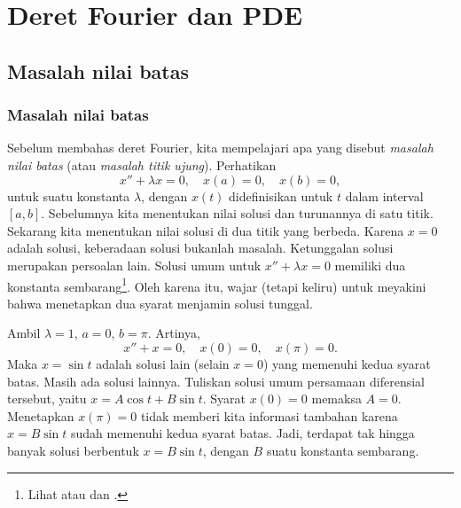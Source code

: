 \chapter{Deret Fourier dan PDE} \label{FS:chapter}


\section{Masalah nilai batas} \label{bvp:section}



\subsection{Masalah nilai batas}

Sebelum membahas deret Fourier, kita mempelajari
apa yang disebut
\emph{masalah nilai batas}
(atau \emph{masalah titik ujung}).  Perhatikan
\begin{equation*}
x'' + \lambda x = 0, \quad x(a) = 0, \quad x(b) = 0,
\end{equation*}
untuk suatu konstanta $\lambda$, dengan $x(t)$ didefinisikan untuk $t$ dalam interval
$[a,b]$.
Sebelumnya kita menentukan nilai solusi dan turunannya
di satu titik.  Sekarang kita menentukan nilai solusi di dua titik
yang berbeda.  Karena $x=0$ adalah solusi, keberadaan
solusi bukanlah masalah.  Ketunggalan solusi merupakan persoalan lain.
Solusi umum untuk $x'' + \lambda x = 0$ memiliki dua
konstanta sembarang\footnote{%
Lihat  atau  dan
.}.
Oleh karena itu,
wajar (tetapi keliru) untuk meyakini bahwa menetapkan dua
syarat menjamin solusi tunggal.

\begin{example}
Ambil $\lambda = 1$,
$a=0$, $b=\pi$.  Artinya,
\begin{equation*}
x'' + x = 0, \quad x(0) = 0, \quad x(\pi) = 0.
\end{equation*}
Maka $x = \sin t$ adalah solusi lain (selain $x=0$) yang memenuhi kedua syarat
batas.  Masih ada solusi lainnya.  Tuliskan solusi umum
persamaan diferensial tersebut, yaitu $x= A \cos t + B \sin t$.
Syarat $x(0) = 0$ memaksa $A=0$.  Menetapkan $x(\pi) = 0$ tidak
memberi kita informasi tambahan karena $x = B \sin t$ sudah memenuhi kedua
syarat batas.
Jadi, terdapat tak hingga banyak solusi berbentuk $x = B \sin t$,
dengan $B$ suatu konstanta sembarang.
\end{example}

